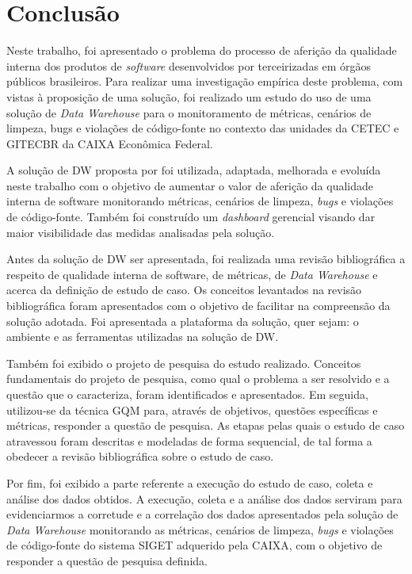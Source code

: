 \chapter{Conclusão}

Neste trabalho, foi apresentado o problema do processo de aferição da qualidade interna dos produtos de \textit{software} desenvolvidos por terceirizadas em órgãos públicos brasileiros. Para realizar uma investigação empírica deste problema, com vistas à proposição de uma solução, foi realizado um estudo do uso de uma solução de \textit{Data Warehouse} para o monitoramento de métricas, cenários de limpeza, bugs e violações de código-fonte no contexto das unidades da  CETEC e GITECBR da CAIXA Econômica Federal.

A solução de DW proposta por  foi utilizada, adaptada, melhorada e evoluída neste trabalho com o objetivo de aumentar o valor de aferição da qualidade interna de software monitorando métricas, cenários de limpeza, \textit{bugs} e violações de código-fonte. Também foi construído um \textit{dashboard} gerencial visando dar maior visibilidade das medidas analisadas pela solução.

Antes da solução de DW ser apresentada, foi realizada uma revisão bibliográfica a respeito de qualidade interna de software, de métricas, de \textit{Data Warehouse} e acerca da definição de estudo de caso. Os conceitos levantados na revisão bibliográfica foram apresentados com o objetivo de facilitar na compreensão da solução adotada. Foi apresentada a plataforma da solução, quer sejam: o ambiente e as ferramentas utilizadas na solução de DW. 

Também foi exibido o projeto de pesquisa do estudo realizado. Conceitos fundamentais do projeto de pesquisa, como qual o problema a ser resolvido e a questão que o caracteriza, foram identificados e apresentados. Em seguida, utilizou-se da  técnica GQM para, através de objetivos, questões específicas e métricas, responder a questão de pesquisa. As etapas pelas quais o estudo de caso atravessou foram descritas e modeladas de forma sequencial, de tal forma a obedecer a revisão bibliográfica sobre o estudo de caso.

Por fim, foi exibido a parte referente a execução do estudo de caso, coleta e análise dos dados obtidos. A execução, coleta e a análise dos dados serviram para evidenciarmos a corretude e a correlação dos dados apresentados pela solução de \textit{Data Warehouse} monitorando as métricas, cenários de limpeza, \textit{bugs} e violações de código-fonte do sistema SIGET adquerido pela CAIXA, com o objetivo de responder a questão de pesquisa definida.




